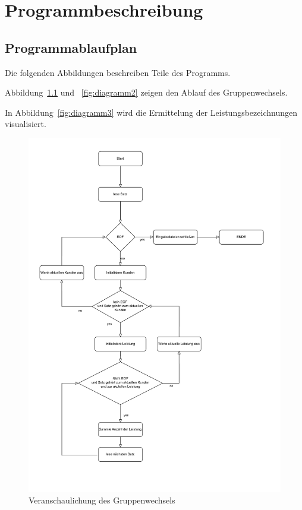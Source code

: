 \chapter{Programmbeschreibung}\label{ch:programmbeschreibung}

\section{Programmablaufplan}\label{sec:pap}
Die folgenden Abbildungen beschreiben Teile des Programms.

Abbildung~\ref{fig:diagramm1} und ~\ref{fig:diagramm2} zeigen den Ablauf des Gruppenwechsels.

In Abbildung~\ref{fig:diagramm3} wird die Ermittelung der Leistungsbezeichnungen visualisiert.


\begin{figure}[!h]
    \centering
    \includegraphics[scale=0.9,width=\textwidth,height=\textheight,keepaspectratio]{images/Gruppenwechsel-PAP.pdf}
    \caption{
        Veranschaulichung des Gruppenwechsels
    }
    \label{fig:diagramm1}
\end{figure}

